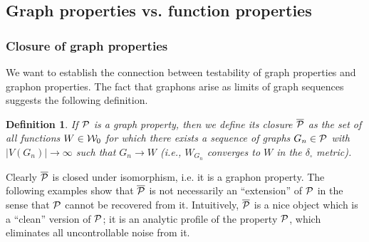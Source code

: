 \documentclass{article}
\newtheorem{definition}[theorem]{Definition}
\begin{document}
\subsection{Graph properties vs. function properties}

\subsubsection{Closure of graph properties}

We want to establish the connection between testability of graph
properties and graphon properties. The fact that graphons arise as
limits of graph sequences suggests the following definition.

\begin{definition}
If $\mathcal{P}$ is a graph property, then we define its {\it closure}
$\overline{\mathcal{P}}$ as the set of all functions $W\in\mathcal{W}_0$ for which
there exists a sequence of graphs $G_n\in\mathcal{P}$ with
$|V(G_n)|\to\infty$ such that $G_n\to W$ (i.e., $W_{G_n}$ converges to $W$ in
the $\delta_\square$ metric).
\end{definition}

Clearly $\overline{\mathcal{P}}$ is closed under isomorphism, i.e. it is a
graphon property. The following examples show that $\overline{\mathcal{P}}$
is not necessarily an ``extension'' of $\mathcal{P}$ in the sense that $\mathcal{P}$
cannot be recovered from it. Intuitively, $\overline{\mathcal{P}}$ is a nice
object which is a ``clean'' version of $\mathcal{P}$; it is an analytic
profile of the property $\mathcal{P}$, which eliminates all uncontrollable
noise from it.
\end{document}
